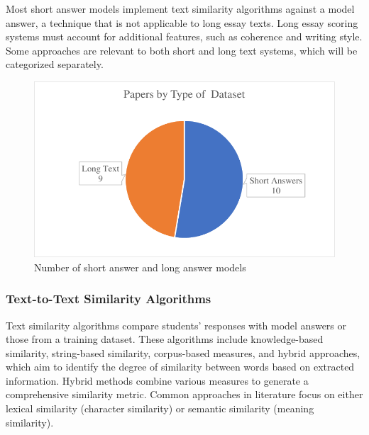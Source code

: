 \documentclass{article}
\begin{document}
	Most short answer models implement text similarity algorithms against a model answer, a technique that is not applicable to long essay texts. Long essay scoring systems must account for additional features, such as coherence and writing style. Some approaches are relevant to both short and long text systems, which will be categorized separately.
	
	\begin{figure}[H]
		\centering
		\includegraphics[width=0.5\linewidth]{img/papersbytype.pdf}
		\caption{Number of short answer and long answer models}
		\label{shortlongcomparison}
	\end{figure}
	
	\subsubsection*{Text-to-Text Similarity Algorithms}
	Text similarity algorithms compare students' responses with model answers or those from a training dataset. These algorithms include knowledge-based similarity, string-based similarity, corpus-based measures, and hybrid approaches, which aim to identify the degree of similarity between words based on extracted information. Hybrid methods combine various measures to generate a comprehensive similarity metric. Common approaches in literature focus on either lexical similarity (character similarity) or semantic similarity (meaning similarity).
	
\end{document}
